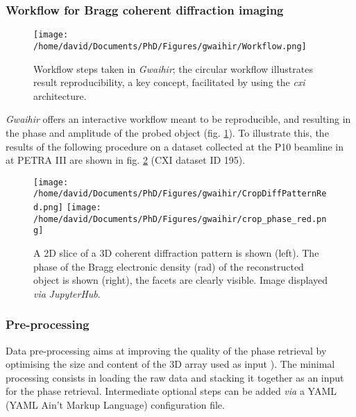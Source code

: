 \subsubsection{Workflow for Bragg coherent diffraction imaging} \label{sec:Workflow}

\begin{figure}[!htb]
    \centering
    \texttt{[image: /home/david/Documents/PhD/Figures/gwaihir/Workflow.png]}
    \caption{Workflow steps taken in \textit{Gwaihir}; the circular workflow illustrates result reproducibility, a key concept, facilitated by using the \textit{cxi} architecture.}
    \label{fig:Workflow}
\end{figure}

\textit{Gwaihir} offers an interactive workflow meant to be reproducible, and resulting in the phase and amplitude of the probed object (fig. \ref{fig:Workflow}).
To illustrate this, the results of the following procedure on a dataset collected at the P10 beamline in at PETRA III are shown in fig. \ref{fig:GUI_file} (CXI dataset ID 195).

\begin{figure}[!htb]
    \centering
    \texttt{[image: /home/david/Documents/PhD/Figures/gwaihir/CropDiffPatternRed.png]}
    \texttt{[image: /home/david/Documents/PhD/Figures/gwaihir/crop\_phase\_red.png]}
    \caption{
    A 2D slice of a 3D coherent diffraction pattern is shown (left).
    The phase of the Bragg electronic density (\unit{\radian}) of the reconstructed object is shown (right), the facets are clearly visible.
    Image displayed \textit{via} \textit{JupyterHub}.
    }
    \label{fig:GUI_file}
\end{figure}

\subsubsection{Pre-processing} \label{sec:preprocess}

Data pre-processing aims at improving the quality of the phase retrieval by optimising the size and content of the 3D array used as input \parencite{ozturk_performance_2017}).
The minimal processing consists in loading the raw data and stacking it together as an input for the phase retrieval.
Intermediate optional steps can be added \textit{via} a YAML (YAML Ain't Markup Language) configuration file.

